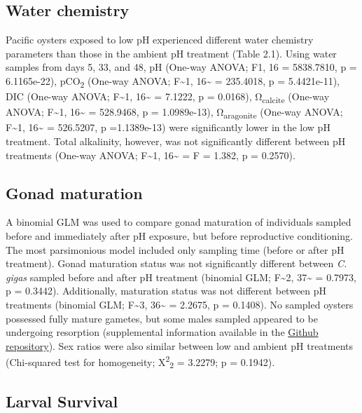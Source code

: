 \documentclass [11pt, proquest] {uwthesis}[2015/03/03]
\begin{document}
\hypertarget{water-chemistry}{%
\subsection{Water chemistry}\label{water-chemistry}}

Pacific oysters exposed to low pH experienced different water chemistry parameters than those in the ambient pH treatment (Table 2.1). Using water samples from days 5, 33, and 48, pH (One-way ANOVA; F1, 16 = 5838.7810, p = 6.1165e-22), pCO\textsubscript{2} (One-way ANOVA; F\textasciitilde1, 16\textasciitilde{} = 235.4018, p = 5.4421e-11), DIC (One-way ANOVA; F\textasciitilde1, 16\textasciitilde{} = 7.1222, p = 0.0168), Ω\textsubscript{calcite} (One-way ANOVA; F\textasciitilde1, 16\textasciitilde{} = 528.9468, p = 1.0989e-13), Ω\textsubscript{aragonite} (One-way ANOVA; F\textasciitilde1, 16\textasciitilde{} = 526.5207, p =1.1389e-13) were significantly lower in the low pH treatment. Total alkalinity, however, was not significantly different between pH treatments (One-way ANOVA; F\textasciitilde1, 16\textasciitilde{} = F = 1.382, p = 0.2570).

\hypertarget{gonad-maturation}{%
\subsection{Gonad maturation}\label{gonad-maturation}}

A binomial GLM was used to compare gonad maturation of individuals sampled before and immediately after pH exposure, but before reproductive conditioning. The most parsimonious model included only sampling time (before or after pH treatment). Gonad maturation status was not significantly different between \emph{C. gigas} sampled before and after pH treatment (binomial GLM; F\textasciitilde2, 37\textasciitilde{} = 0.7973, p = 0.3442). Additionally, maturation status was not different between pH treatments (binomial GLM; F\textasciitilde3, 36\textasciitilde{} = 2.2675, p = 0.1408). No sampled oysters possessed fully mature gametes, but some males sampled appeared to be undergoing resorption (supplemental information available in the \href{https://github.com/RobertsLab/paper-gigas-early-gametogenic-exposure}{Github repository}). Sex ratios were also similar between low and ambient pH treatments (Chi-squared test for homogeneity; X\textsuperscript{2}\textsubscript{2} = 3.2279; p = 0.1942).

\hypertarget{larval-survival}{%
\subsection{Larval Survival}\label{larval-survival}}
\end{document}
